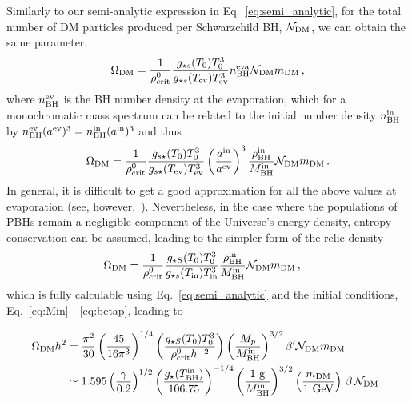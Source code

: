 \documentclass[aps,prd,reprint,twocolumn,preprintnumbers,floatfix,nofootinbib]{revtex4-1}
\newcommand{\MBH}{M_{\rm BH}}
\newcommand{\TBHi}{T_{\rm BH}^{\rm in}}
\newcommand{\MPL}{M_p}
\newcommand{\GeV}{\rm GeV}
\begin{document}
Similarly to our semi-analytic expression in  Eq.~\eqref{eq:semi_analytic}, for the total number of DM particles produced per Schwarzchild BH, $\mathcal{N}_{\rm DM}$, we can obtain the same parameter, 
\begin{equation}
    \Omega_{\rm DM}=  \frac{1}{\rho^0_{\rm crit}}\frac{g_{\star s}(T_0)T_0^3}{g_{\star s}(T_{\rm ev})T_{\rm ev}^3} n_{\rm BH}^{\rm eva}\mathcal{N}_{\rm DM} m_{\rm DM}\,,
\end{equation}
where $n_{\rm BH}^{\rm ev}$ is the BH number density at the evaporation, which for a monochromatic mass spectrum can be related to the initial number density $n_{\rm BH}^{\rm in}$ by $n_{\rm BH}^{\rm ev}(a^{\rm ev})^3=n_{\rm BH}^{\rm in}(a^{\rm in})^3$ and thus
\begin{align}
   \Omega_{\rm DM}=  \frac{1}{\rho^0_{\rm crit}}\frac{g_{s \star}(T_0)T_0^3}{g_{s \star}(T_{\rm ev})T_{\rm ev}^3} \left(\frac{a^{\rm in}}{a^{\rm ev}}\right)^3\frac{\rho_{\rm BH}^{\rm in}}{M_{\rm BH}^{\rm in}}\mathcal{N}_{\rm DM} m_{\rm DM}\,.
\end{align}
In general, it is difficult to get a good approximation for all the above values at evaporation (see, however,~\cite{paperB}). Nevertheless, in the case where the populations of PBHs remain a negligible component of the Universe's energy density, entropy conservation can be assumed, leading to the simpler form of the relic density
\begin{align}
    \Omega_{\rm DM}&=  \frac{1}{\rho^0_{\rm crit}}\frac{g_{\star S}(T_0)T_0^3}{g_{\star s}(T_{\rm in})T_{\rm in}^3} \frac{\rho_{\rm BH}^{\rm in}}{M_{\rm BH}^{\rm in}}\mathcal{N}_{\rm DM} m_{\rm DM}\,,
\end{align}
which is fully calculable using Eq.~\eqref{eq:semi_analytic} and the initial conditions, Eq.~\eqref{eq:Min} - \eqref{eq:betap}, leading to 
\begin{widetext}
\begin{align}
    \Omega_{\rm DM}h^2
    &=\frac{\pi^2}{30}\left(\frac{45}{16 \pi^3}\right)^{1/4} \left(\frac{g_{\star S}(T_0)T_0^3}{\rho^0_{\rm crit} h^{-2}}\right)\left(\frac{\MPL}{\MBH^{\rm in}}\right)^{3/2}\beta^\prime \mathcal{N}_{\rm DM} m_{\rm DM}\notag\\
    &\simeq 1.595 \left(\frac{\gamma}{0.2}\right)^{1/2}\left(\frac{g_\star(\TBHi)}{106.75}\right)^{-1/4}\left(\frac{1~{\rm g}}{\MBH^{\rm in}}\right)^{3/2}\left(\frac{m_{\rm DM}}{1~\GeV}\right)\,\beta\,\mathcal{N}_{\rm DM}\,.
\label{eq:relic_approx}
\end{align}
\end{widetext}
\end{document}
